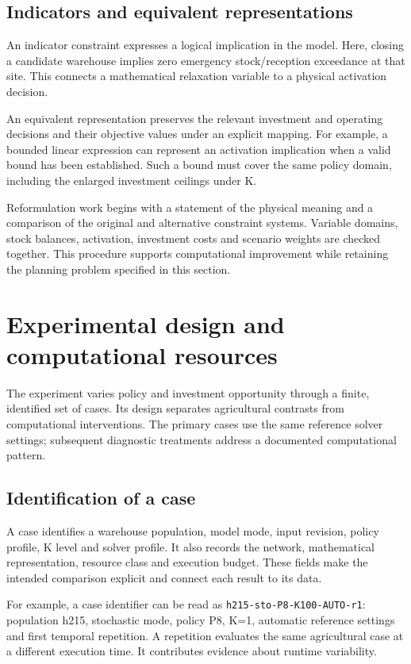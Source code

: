 \documentclass[11pt,a4paper]{article}
\newcommand{\code}[1]{{\small\texttt{#1}}}
\begin{document}
\subsection{Indicators and equivalent representations}

An indicator constraint expresses a logical implication in the model. Here, closing a candidate warehouse implies zero emergency stock/reception exceedance at that site. This connects a mathematical relaxation variable to a physical activation decision.

An equivalent representation preserves the relevant investment and operating decisions and their objective values under an explicit mapping. For example, a bounded linear expression can represent an activation implication when a valid bound has been established. Such a bound must cover the same policy domain, including the enlarged investment ceilings under K.

Reformulation work begins with a statement of the physical meaning and a comparison of the original and alternative constraint systems. Variable domains, stock balances, activation, investment costs and scenario weights are checked together. This procedure supports computational improvement while retaining the planning problem specified in this section.


\section{Experimental design and computational resources}
\label{sec:experiments}

The experiment varies policy and investment opportunity through a finite, identified set of cases. Its design separates agricultural contrasts from computational interventions. The primary cases use the same reference solver settings; subsequent diagnostic treatments address a documented computational pattern.

\subsection{Identification of a case}

A case identifies a warehouse population, model mode, input revision, policy profile, K level and solver profile. It also records the network, mathematical representation, resource class and execution budget. These fields make the intended comparison explicit and connect each result to its data.

For example, a case identifier can be read as \code{h215-sto-P8-K100-AUTO-r1}: population h215, stochastic mode, policy P8, K=1, automatic reference settings and first temporal repetition. A repetition evaluates the same agricultural case at a different execution time. It contributes evidence about runtime variability.
\end{document}
